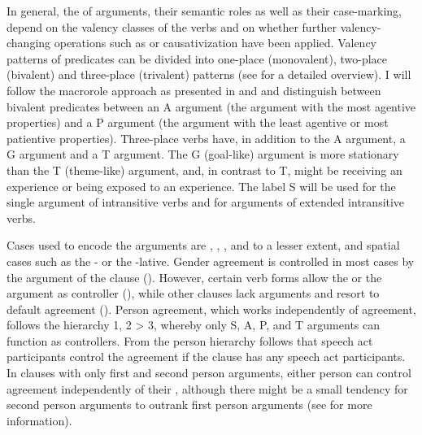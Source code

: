 In general, the  of arguments, their semantic roles as well as their case-marking, depend on the valency classes of the verbs and on whether further valency-changing operations such as  or causativization have been applied. Valency patterns of predicates can be divided into one-place (monovalent), two-place (bivalent) and three-place (trivalent) patterns (see  for a detailed overview). I will follow the macrorole approach as presented in \citet{Bickel2011} and \citet{Bickel.etal2015} and distinguish between bivalent predicates between an A argument (the argument with the most agentive properties) and a P argument (the argument with the least agentive or most patientive properties). Three-place verbs have, in addition to the A argument, a G argument and a T argument. The G (goal-like) argument is more stationary than the T (theme-like) argument, and, in contrast to T, might be receiving an experience or being exposed to an experience. The label S will be used for the single argument of intransitive verbs and for  arguments of extended intransitive verbs.

Cases used to encode the arguments are , , , and to a lesser extent,  and spatial cases such as the - or the -lative. Gender agreement is controlled in most cases by the  argument of the clause (). However, certain verb forms allow the  or the  argument as controller (), while other clauses lack  arguments and resort to default agreement (). Person agreement, which works  independently of  agreement, follows the hierarchy 1, 2 > 3, whereby only S, A, P, and T arguments can function as controllers. From the person hierarchy follows that speech act participants control the agreement if the clause has any speech act participants. In clauses with only first and second person arguments, either person can control agreement independently of their , although there might be a small tendency for second person arguments to outrank first person arguments (see  for more information).


